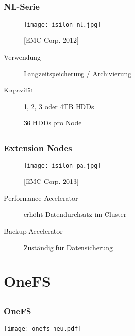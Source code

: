 \documentclass{beamer}
\begin{document}
\subsection{}
\begin{frame}[fragile]
  \frametitle{NL-Serie}
  
  \begin{figure}[htp]
    \centering
    \texttt{[image: isilon-nl.jpg]}
    \caption{[EMC Corp. 2012]}
  \end{figure}
  
  \begin{description} 
    \item[Verwendung] Langzeitspeicherung / Archivierung
    \vspace{5mm}
    \item[Kapazität] 1, 2, 3 oder 4TB HDDs
    \item[] 36 HDDs pro Node 
        
  \end{description}

\end{frame}

\subsection{}
\begin{frame}[fragile]
  \frametitle{Extension Nodes}
  \begin{figure}[htp]
    \centering
    \texttt{[image: isilon-pa.jpg]}
    \caption{[EMC Corp. 2013]}
  \end{figure}
  
  \begin{description}
    \item[Performance Accelerator] erhöht Datendurchsatz im Cluster
    \item[Backup Accelerator] Zuständig für Datensicherung
  \end{description}

  
\end{frame}

\section{OneFS}

\subsection{}
\begin{frame}[fragile]
  \frametitle{OneFS}

  \begin{center}\texttt{[image: onefs-neu.pdf]}\end{center}

\end{frame}  
\end{document}

